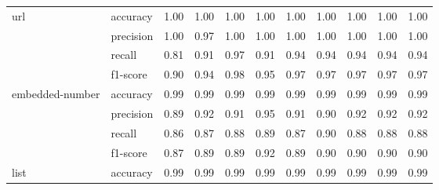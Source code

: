 \begin{tabular}{llrrrrrrrrr}
url & accuracy &                    1.00 &                    1.00 &                    1.00 &                    1.00 &                    1.00 &                    1.00 &                    1.00 &                    1.00 &                    1.00 \\
                 & precision &                    1.00 &                    0.97 &                    1.00 &                    1.00 &                    1.00 &                    1.00 &                    1.00 &                    1.00 &                    1.00 \\
                 & recall &                    0.81 &                    0.91 &                    0.97 &                    0.91 &                    0.94 &                    0.94 &                    0.94 &                    0.94 &                    0.94 \\
                 & f1-score &                    0.90 &                    0.94 &                    0.98 &                    0.95 &                    0.97 &                    0.97 &                    0.97 &                    0.97 &                    0.97 \\
embedded-number & accuracy &                    0.99 &                    0.99 &                    0.99 &                    0.99 &                    0.99 &                    0.99 &                    0.99 &                    0.99 &                    0.99 \\
                 & precision &                    0.89 &                    0.92 &                    0.91 &                    0.95 &                    0.91 &                    0.90 &                    0.92 &                    0.92 &                    0.92 \\
                 & recall &                    0.86 &                    0.87 &                    0.88 &                    0.89 &                    0.87 &                    0.90 &                    0.88 &                    0.88 &                    0.88 \\
                 & f1-score &                    0.87 &                    0.89 &                    0.89 &                    0.92 &                    0.89 &                    0.90 &                    0.90 &                    0.90 &                    0.90 \\
list & accuracy &                    0.99 &                    0.99 &                    0.99 &                    0.99 &                    0.99 &                    0.99 &                    0.99 &                    0.99 &                    0.99 \\

\end{tabular}
